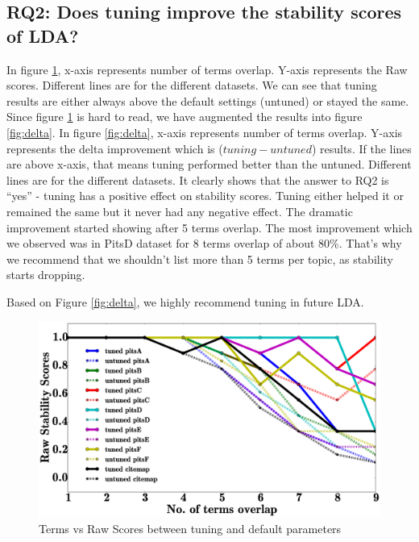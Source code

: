 \documentclass[conference]{IEEEtran}
\theoremstyle{break}
\begin{document}
\subsection{\textbf{RQ2: Does tuning improve the stability scores of LDA?}}

In figure \ref{fig:raw}, x-axis represents number of terms overlap. Y-axis represents the Raw scores. Different lines are for the different datasets. We can see that tuning results are either always above the default settings (untuned) or stayed the same. Since figure \ref{fig:raw} is hard to read, we have augmented the results into figure \ref{fig:delta}. In figure \ref{fig:delta}, x-axis represents number of terms overlap. Y-axis represents the delta improvement which is ($tuning - untuned$) results. If the lines are above x-axis, that means tuning performed better than the untuned. Different lines are for the different datasets. It clearly shows that the answer to RQ2 is “yes” - tuning has a positive effect on stability scores. Tuning either helped it or remained the same but it never had any negative effect. The dramatic improvement started showing after 5 terms overlap. The most improvement which we observed was in PitsD dataset for 8 terms overlap of about 80\%. That's why we recommend that we shouldn't list more than 5 terms per topic, as stability starts dropping.

\begin{lesson}
Based on Figure \ref{fig:delta}, we highly recommend tuning in future LDA.
\end{lesson}

\begin{center}
\begin{figure}[!htb]
  \includegraphics[width=\linewidth]{./fig/raw_graph.eps}
  \caption{Terms vs Raw Scores between tuning and default parameters}
  \label{fig:raw}
\end{figure}
\end{center}
\end{document}
